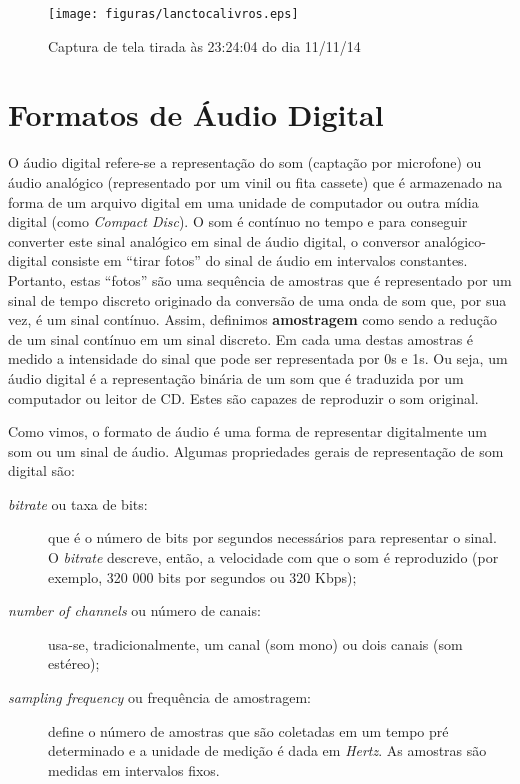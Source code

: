  \begin{figure}[ht]
	\centering
		\texttt{[image: figuras/lanctocalivros.eps]}
	\caption{Captura de tela tirada às 23:24:04 do dia 11/11/14 \cite{tocalivros}}
	\label{lanctocalivros}
\end{figure}

\section{Formatos de Áudio Digital}

O áudio digital refere-se a representação do som (captação por microfone) ou áudio analógico (representado por um vinil ou fita cassete) que é armazenado na forma de um arquivo digital em uma unidade de computador ou outra mídia digital (como \textit{Compact Disc}). O som é contínuo no tempo e para conseguir converter este sinal analógico em sinal de áudio digital, o conversor analógico-digital consiste em ``tirar fotos'' do sinal de áudio em intervalos constantes. Portanto, estas ``fotos'' são uma sequência de amostras que é representado por um sinal de tempo discreto originado da conversão de uma onda de som que, por sua vez, é um sinal contínuo. Assim, definimos \textbf{amostragem} como sendo a redução de um sinal contínuo em um sinal discreto. Em cada uma destas amostras é medido a intensidade do sinal que pode ser representada por 0s e 1s. Ou seja, um áudio digital é a representação binária de um som que é traduzida por um computador ou leitor de CD. Estes são capazes de reproduzir o som original.

Como vimos, o formato de áudio é uma forma de representar digitalmente um som ou um sinal de áudio. Algumas propriedades gerais de representação de som digital são:

\begin{description}
	\item [\textit{bitrate} ou taxa de bits:] que é o número de bits por segundos necessários para representar o sinal. O \textit{bitrate} descreve, então, a velocidade com que o som é reproduzido (por exemplo, 320 000 bits por segundos ou 320 Kbps);
	\item [\textit{number of channels} ou número de canais:] usa-se, tradicionalmente, um canal (som mono) ou dois canais (som estéreo); 
	\item [\textit{sampling frequency} ou frequência de amostragem:] define o número de amostras que são coletadas em um tempo pré determinado e a unidade de medição é dada em \textit{Hertz}. As amostras são medidas em intervalos fixos.
\end{description}

